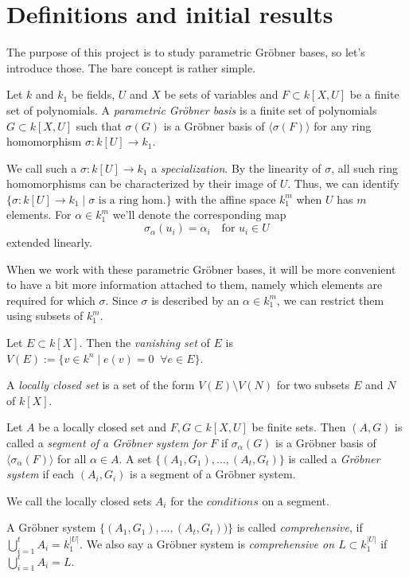 \documentclass[a4paper, 12pt]{article}
\theoremstyle{changedot}
\theoremstyle{changedotbreak}
\theoremstyle{nonumberplain}
\begin{document}
\section{Definitions and initial results}
The purpose of this project is to study parametric Gröbner bases, so let's introduce those. The bare concept is rather simple.

\begin{definition}\label{def:par_grb}
  Let $k$ and $k_{1}$ be fields, $U$ and $X$ be sets of variables and $F \subset k[X, U]$ be a finite set of polynomials. A \textit{parametric Gröbner basis} is a finite set of polynomials $G \subset k[X, U]$ such that $\sigma(G)$ is a Gröbner basis of $\langle \sigma(F) \rangle$ for any ring homomorphism $\sigma : k[U] \to k_{1}$.
\end{definition}

We call such a $\sigma : k[U] \to k_{1}$ a \textit{specialization}. By the linearity of $\sigma$, all such ring homomorphisms can be characterized by their image of $U$. Thus, we can identify $\{\sigma : k[U] \to k_{1} \mid \sigma \text{ is a ring hom.}\}$ with the affine space $k_{1}^{m}$ when $U$ has $m$ elements. For $\alpha \in k_{1}^{m}$ we'll denote the corresponding map
\[\sigma_{\alpha}(u_{i}) = \alpha_{i} \quad \text{for $u_{i} \in U$}\] extended linearly.

When we work with these parametric Gröbner bases, it will be more convenient to have a bit more information attached to them, namely which elements are required for which $\sigma$. Since $\sigma$ is described by an $\alpha \in k_{1}^{m}$, we can restrict them using subsets of $k_{1}^{m}$.

\begin{definition}
  Let $E \subset k[X]$. Then the \textit{vanishing set} of $E$ is $V(E) := \{v \in k^{n} \mid e(v) = 0 \;\; \forall e \in E\}$.

  A \textit{locally closed set} is a set of the form $V(E) \setminus V(N)$ for two subsets $E$ and $N$ of $k[X]$.
\end{definition}

\begin{definition}
  Let $A$ be a locally closed set and $F, G \subset k[X, U]$ be finite sets. Then $(A, G)$ is called a \textit{segment of a Gröbner system for $F$} if $\sigma_{\alpha}(G)$ is a Gröbner basis of $\langle \sigma_{\alpha}(F) \rangle$ for all $\alpha \in A$. A set $\{(A_{1}, G_{1}), \dots, (A_{t}, G_{t})\}$ is called a \textit{Gröbner system} if each $(A_{i}, G_{i})$ is a segment of a Gröbner system.

  We call the locally closed sets $A_{i}$ for the $\textit{conditions}$ on a segment.

  A Gröbner system $\{(A_{1}, G_{1}), \dots, (A_{t}, G_{t}))\}$ is called \textit{comprehensive}, if $\bigcup_{i=1}^{t}A_{i} = k_{1}^{|U|}$. We also say a Gröbner system is \textit{comprehensive on $L \subset k_{1}^{|U|}$} if $\bigcup_{i=1}^{t}A_{i} = L$.
\end{definition}
\end{document}
